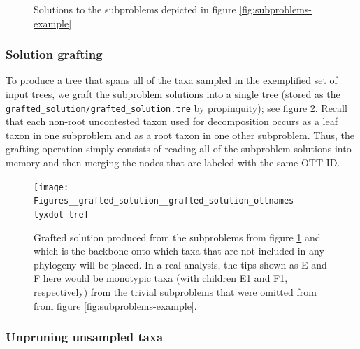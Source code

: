 \documentclass[fleqn,12pt,lineno,english]{wlpeerj}
\newcommand{\lyxdot}{.}
\begin{document}
\begin{figure}
\hfill{}\hfill{}\hfill{}

\caption{Solutions to the subproblems depicted in figure \ref{fig:subproblems-example}}
\label{fig:subproblem-solutions.}
\end{figure}


\subsubsection{Solution grafting}

To produce a tree that spans all of the taxa sampled in the exemplified
set of input trees, we graft the subproblem solutions into a single
tree (stored as the \texttt{grafted\_solution/grafted\_solution.tre}
by propinquity); see figure \ref{fig:grafted-solution}. Recall that each non-root uncontested taxon used
for decomposition occurs as a leaf taxon in one subproblem and as
a root taxon in one other subproblem. Thus, the grafting operation
simply consists of reading all of the subproblem solutions into memory
and then merging the nodes that are labeled with the same OTT ID.

\begin{figure}
\begin{centering}
\texttt{[image: Figures\_\_grafted\_solution\_\_grafted\_solution\_ottnames\\lyxdot tre]}
\par\end{centering}
\caption{Grafted solution produced from the subproblems from
figure \ref{fig:subproblem-solutions.} and which is the 
backbone onto which taxa that are not included in any phylogeny
will be placed.
In a real analysis, the tips shown as E and F here
would be monotypic taxa (with children E1 and F1, respectively)
from the trivial subproblems that were omitted from from figure \ref{fig:subproblems-example}.}
\label{fig:grafted-solution}
\end{figure}


\subsubsection{Unpruning unsampled taxa}
\end{document}
